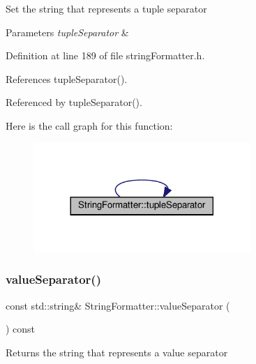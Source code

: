 Set the string that represents a tuple separator 
\begin{DoxyParams}{Parameters}
{\em tuple\+Separator} & \\
\hline
\end{DoxyParams}


Definition at line 189 of file string\+Formatter.\+h.



References tuple\+Separator().



Referenced by tuple\+Separator().

Here is the call graph for this function\+:
\nopagebreak
\begin{figure}[H]
\begin{center}
\leavevmode
\includegraphics[width=233pt]{classStringFormatter_a5346783f609217a80f49d542e2b4468c_cgraph}
\end{center}
\end{figure}
\mbox{\label{classStringFormatter_a019b766e21b34474a7569d2d12f25d0e}} 
\subsubsection{\texorpdfstring{value\+Separator()}{valueSeparator()}\hspace{0.1cm}{\footnotesize\ttfamily [1/2]}}
{\footnotesize\ttfamily const std\+::string\& String\+Formatter\+::value\+Separator (\begin{DoxyParamCaption}{ }\end{DoxyParamCaption}) const\hspace{0.3cm}{\ttfamily [inline]}}

\begin{DoxyReturn}{Returns}
the string that represents a value separator 
\end{DoxyReturn}


